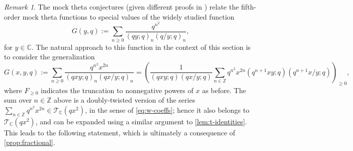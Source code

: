 \documentclass[reqno,11pt]{amsart}
\theoremstyle{definition}
\newtheorem{question}{Question}
\theoremstyle{remark}
\newtheorem*{remark}{Remark}
\numberwithin{equation}{section}
\newcommand{\Z}{\mathbb{Z}}
\newcommand{\C}{\mathbb{C}}
\newcommand{\mT}{\mathcal{T}}
\newcommand{\fix}[1]{\textcolor{blue}{\large (#1)\normalsize}}
\begin{document}

\begin{remark}
The mock theta conjectures (given different proofs in \cite{hickerson1988proof,folsom2008short}) relate the fifth-order mock theta functions to special values of the widely studied function \cite{ramanujan1988lost,dyson1944some,bringmann2010dyson,andrews2018four} %
\begin{equation}\label{eq:generalized-mock-theta}
    G(y, q) := \sum_{n \ge 0} \frac{q^{n^2}}{(qy; q)_n (q/y; q)_n},
\end{equation}
for $y \in \C$. The natural approach to this function in the context of this section is to consider the generalization
\[
    G(x, y, q) := \sum_{n \ge 0} \frac{q^{n^2}x^{2n}}{(qxy; q)_n (qx/y; q)_n}
    =
    \left(\frac{1}{(qxy; q)(qx/y; q)} \sum_{n \in \Z} q^{n^2}x^{2n} \left(q^{n+1}xy; q\right) \left(q^{n+1}x/y; q\right) \right)_{\ge 0},
\]
where $F_{\ge 0}$ indicates the truncation to nonnegative powers of $x$ as before. The sum over $n \in \Z$ above is a doubly-twisted version of the series $\sum_{n \in \Z} q^{n^2} x^{2n} \in \mT_\C\left(qx^2\right)$, in the sense of \cref{eq:w-coeffs}; hence it also belongs to $\mT_\C\left(qx^2\right)$, and can be expanded using a similar argument to \cref{lem:t-identities}. This leads to the following statement, which is ultimately a consequence of \cref{prop:fractional}.
\end{remark}
\end{document}
